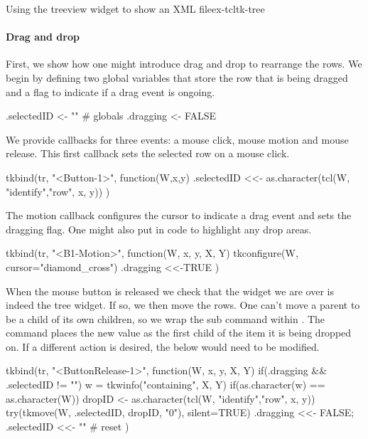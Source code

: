 \begin{example}{Using the treeview widget to show an XML file}{ex-tcltk-tree}
\paragraph{Drag and drop}
First, we show how one might introduce drag and drop to rearrange the
rows. We begin by defining two global variables that store the row
that is being dragged  and a flag to indicate if a drag event is ongoing.
\begin{Schunk}
\begin{Sinput}
 .selectedID <- ""                       # globals
 .dragging <- FALSE
\end{Sinput}
\end{Schunk}
We provide callbacks for three events: a mouse click, mouse motion and mouse release.
This first callback sets the selected row on a mouse click.
\begin{Schunk}
\begin{Sinput}
 tkbind(tr, "<Button-1>", function(W,x,y) {
   .selectedID <<- as.character(tcl(W, "identify","row", x, y))
 })  
\end{Sinput}
\end{Schunk}
The motion callback configures the cursor to indicate a drag event and sets
the dragging flag. One might also put in code to highlight
any drop areas.
\begin{Schunk}
\begin{Sinput}
 tkbind(tr, "<B1-Motion>", function(W, x, y, X, Y) {
   tkconfigure(W, cursor="diamond_cross")
   .dragging <<-TRUE
 })
\end{Sinput}
\end{Schunk}

When the mouse button is released we check that the widget we are over
is indeed the tree widget. If so, we then move the rows. One can't
move a parent to be a child of its own children, so we wrap the
 sub command within . The
 command places the new value as the first child of the
item it is being dropped on. If a different action is desired, the
 below would need to be modified.
\begin{Schunk}
\begin{Sinput}
 tkbind(tr, "<ButtonRelease-1>", function(W, x, y, X, Y) {
   if(.dragging && .selectedID != "") {
     w = tkwinfo("containing", X, Y)
     if(as.character(w) == as.character(W)) {
       dropID <- as.character(tcl(W, "identify","row", x, y))
       try(tkmove(W, .selectedID, dropID, "0"), silent=TRUE)
     }
   }
   .dragging <<- FALSE; .selectedID <<- "" # reset
 })
\end{Sinput}
\end{Schunk}


\end{example}
